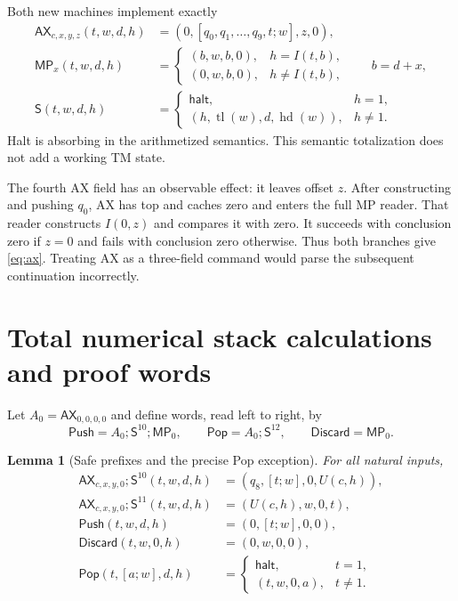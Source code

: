 \documentclass[11pt,a4paper]{article}
\newtheorem{lemma}[theorem]{Lemma}
\newcommand{\hd}{\operatorname{hd}}
\newcommand{\tl}{\operatorname{tl}}
\newcommand{\Ax}{\mathsf{AX}}
\newcommand{\MP}{\mathsf{MP}}
\newcommand{\Shift}{\mathsf{S}}
\newcommand{\Push}{\mathsf{Push}}
\newcommand{\Pop}{\mathsf{Pop}}
\newcommand{\Discard}{\mathsf{Discard}}
\newcommand{\Stop}{\mathsf{halt}}
\begin{document}
Both new machines implement exactly
\begin{align}
 \Ax_{c,x,y,z}(t,w,d,h)
   &=(0,[q_0,q_1,\ldots,q_9,t;w],z,0),\label{eq:ax}\\
 \MP_x(t,w,d,h)
   &=\begin{cases}
      (b,w,b,0),&h=I(t,b),\\
      (0,w,b,0),&h\ne I(t,b),
     \end{cases}\qquad b=d+x,\label{eq:mp}\\
 \Shift(t,w,d,h)
   &=\begin{cases}
      \Stop,&h=1,\\
      (h,\tl(w),d,\hd(w)),&h\ne1.
     \end{cases}\label{eq:shift}
\end{align}
Halt is absorbing in the arithmetized semantics. This semantic
totalization does not add a working TM state.

The fourth AX field has an observable effect: it leaves offset $z$.
After constructing and pushing $q_0$, AX has top and caches zero and
enters the full MP reader. That reader constructs $I(0,z)$ and compares
it with zero. It succeeds with conclusion zero if $z=0$ and fails with
conclusion zero otherwise. Thus both branches give
\eqref{eq:ax}. Treating AX as a three-field command would parse the
subsequent continuation incorrectly.

\section{Total numerical stack calculations and proof words}
\label{sec:words}

Let $A_0=\Ax_{0,0,0,0}$ and define words, read left to right, by
\[
 \Push=A_0;\Shift^{10};\MP_0,\qquad
 \Pop=A_0;\Shift^{12},\qquad
 \Discard=\MP_0.
\]

\begin{lemma}[Safe prefixes and the precise Pop exception]
For all natural inputs,
\begin{align*}
 \Ax_{c,x,y,0};\Shift^{10}(t,w,d,h)
    &=(q_8,[t;w],0,U(c,h)),\\
 \Ax_{c,x,y,0};\Shift^{11}(t,w,d,h)
    &=(U(c,h),w,0,t),\\
 \Push(t,w,d,h)&=(0,[t;w],0,0),\\
 \Discard(t,w,0,h)&=(0,w,0,0),\\
 \Pop(t,[a;w],d,h)&=
 \begin{cases}
  \Stop,&t=1,\\
  (t,w,0,a),&t\ne1.
 \end{cases}
\end{align*}
\end{lemma}
\end{document}

